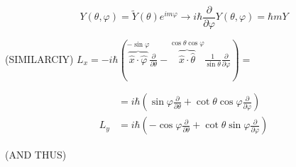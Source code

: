 \documentclass[10pt]{article}
\begin{document}
$$
Y(\theta, \varphi)=\tilde{Y}(\theta) e^{i m \varphi} \rightarrow i \hbar \frac{\partial}{\partial \varphi} Y(\theta, \varphi)=\hbar m Y
$$

(SIMILARCIY) $L_{x}=-i \hbar(\overbrace{\hat{x} \cdot \hat{\varphi}}^{-\sin \varphi} \frac{\partial}{\partial \theta}-\overbrace{\hat{x} \cdot \hat{\theta}}^{\cos \theta \cos \varphi} \frac{1}{\sin \theta} \frac{\partial}{\partial \varphi})=$

$$
\begin{aligned}
& =i \hbar\left(\sin \varphi \frac{\partial}{\partial \theta}+\cot \theta \cos \varphi \frac{\partial}{\partial \varphi}\right) \\
L_{y} & =i \hbar\left(-\cos \varphi \frac{\partial}{\partial \theta}+\cot \theta \sin \varphi \frac{\partial}{\partial \varphi}\right)
\end{aligned}
$$

(AND THUS)
\end{document}
